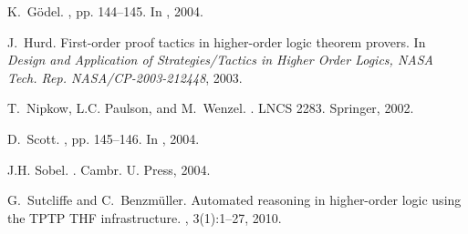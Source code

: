 \documentclass[11pt,a4paper]{article}
\begin{document}
\begin{thebibliography}{10}
K.~G\"odel.
, pp. 144--145.
\newblock In  \cite{sobel2004logic}, 2004.


J.~Hurd.
\newblock First-order proof tactics in higher-order logic theorem provers.
\newblock In {\em Design and Application of Strategies/Tactics in Higher Order
  Logics, NASA Tech. Rep. NASA/CP-2003-212448}, 2003.

T.~Nipkow, L.C. Paulson, and M.~Wenzel.
.
\newblock LNCS 2283. Springer, 2002.

D.~Scott.
, pp. 145--146.
\newblock In  \cite{sobel2004logic}, 2004.

J.H. Sobel.
.
\newblock Cambr. U. Press, 2004.

G.~Sutcliffe and C.~Benzm{\"u}ller.
\newblock Automated reasoning in higher-order logic using the {TPTP THF}
  infrastructure.
, 3(1):1--27, 2010.

\end{thebibliography}
\end{document}
